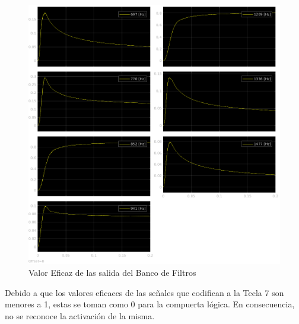 \begin{figure}[H]
  \centering
  \includegraphics[width=\linewidth]{images/simulacion/fallas/rms/7.png}
  \caption{Valor Eficaz de las salida del Banco de Filtros }
  \label{fig:num_7_rms}
\end{figure}

Debido a que los valores eficaces de las señales que codifican a la Tecla 7 son menores a 1, estas se toman como 0 para la compuerta lógica. En consecuencia, no se reconoce la activación de la misma.


